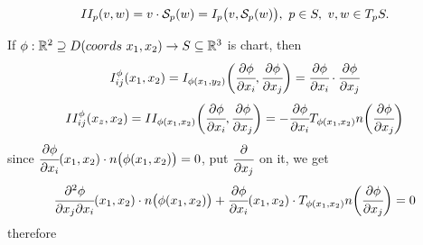 \documentclass[10pt]{article}
\begin{document}
		\begin{definition}
			\begin{equation*}
				\begin{aligned}
					II_p(v,w) =v\cdot\mathcal{S}_p(w) = I_p\big(v, \mathcal{S}_p(w)\big), \thinspace\thinspace p\in S, \thinspace\thinspace v,w\in T_pS.
				\end{aligned}
			\end{equation*}
		\end{definition}

		\begin{remark}
			If $\phi: \mathbb{R}^2\supseteq D(coords\thinspace\thinspace x_1, x_2)\rightarrow S\subseteq\mathbb{R}^3$ is chart, then
			\begin{equation*}
				\begin{aligned}
					I_{ij}^\phi(x_1, x_2) = I_{\phi(x_1,y_2)}\bigg(\cfrac{\partial\phi}{\partial x_i}, \cfrac{\partial\phi}{\partial x_j} \bigg) = \cfrac{\partial\phi}{\partial x_i}\cdot\cfrac{\partial\phi}{\partial x_j}
				\end{aligned}
			\end{equation*}
			\begin{equation*}
				\begin{aligned}
					II_{ij}^\phi(x_z, x_2) = II_{\phi(x_1,x_2)}\bigg(\cfrac{\partial\phi}{\partial x_i}, \cfrac{\partial\phi}{\partial x_j} \bigg) = -\cfrac{\partial\phi}{\partial x_i} T_{\phi(x_1,x_2)}n\bigg(\cfrac{\partial\phi}{\partial x_j}\bigg)
				\end{aligned}
			\end{equation*}
			since $\cfrac{\partial\phi}{\partial x_i}(x_1,x_2)\cdot n\big(\phi(x_1,x_2)\big) = 0$, put $\cfrac{\partial}{\partial x_j}$ on it, we get
			\begin{equation*}
				\begin{aligned}
					\cfrac{\partial^2\phi}{\partial x_j\partial x_i}(x_1,x_2)\cdot n\big(\phi(x_1,x_2)\big) + \cfrac{\partial\phi}{\partial x_i}(x_1,x_2)\cdot T_{\phi(x_1,x_2)}n\bigg( \cfrac{\partial\phi}{\partial x_j} \bigg) = 0
				\end{aligned}
			\end{equation*}
			therefore
\end{remark}
\end{document}
